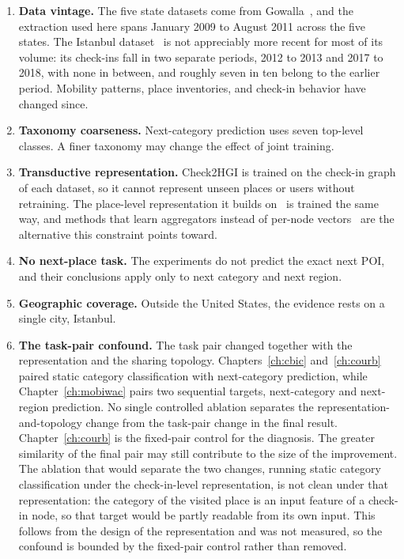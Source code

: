 \begin{enumerate}
    \item \textbf{Data vintage.} The five state datasets come from
    Gowalla~\cite{cho2011gowalla}, and the extraction used here spans January 2009
    to August 2011 across the five states. The Istanbul
    dataset~\cite{wongso2025massivesteps} is not appreciably more recent for most of its
    volume: its check-ins fall in two separate periods, 2012 to 2013 and 2017 to 2018,
    with none in between, and roughly seven in ten belong to the earlier period.
    Mobility patterns, place inventories,
    and check-in behavior have changed since.
    \item \textbf{Taxonomy coarseness.} Next-category prediction uses seven top-level
    classes. A finer taxonomy may change the effect of joint training.
    \item \textbf{Transductive representation.} Check2HGI is trained on the check-in
    graph of each dataset, so it cannot represent unseen places or users without
    retraining. The place-level representation it builds
    on~\cite{huang2023hgi} is trained the same way, and methods that learn aggregators
    instead of per-node vectors~\cite{hamilton2017graphsage} are the alternative this
    constraint points toward.
    \item \textbf{No next-place task.} The experiments do not predict the exact next
    POI, and their conclusions apply only to next category and next region.
    \item \textbf{Geographic coverage.} Outside the United States, the evidence rests on
    a single city, Istanbul.
    \item \textbf{The task-pair confound.} The task pair changed together with the
    representation and the sharing topology. Chapters~\ref{ch:cbic}
    and~\ref{ch:courb} paired static category classification with next-category
    prediction, while Chapter~\ref{ch:mobiwac} pairs two sequential targets,
    next-category and next-region prediction. No single controlled ablation
    separates the representation-and-topology change from the task-pair change in
    the final result. Chapter~\ref{ch:courb} is the fixed-pair control for the
    diagnosis. The greater similarity of
    the final pair may still contribute to the size of the improvement. The
    ablation that would separate the two changes,
    running static category classification under the check-in-level representation, is
    not clean under that representation: the category of the visited place is an input
    feature of a check-in node, so that target would be partly readable from its own
    input. This follows from the design of the representation and was not measured, so
    the confound is bounded by the fixed-pair control rather than removed.
\end{enumerate}


